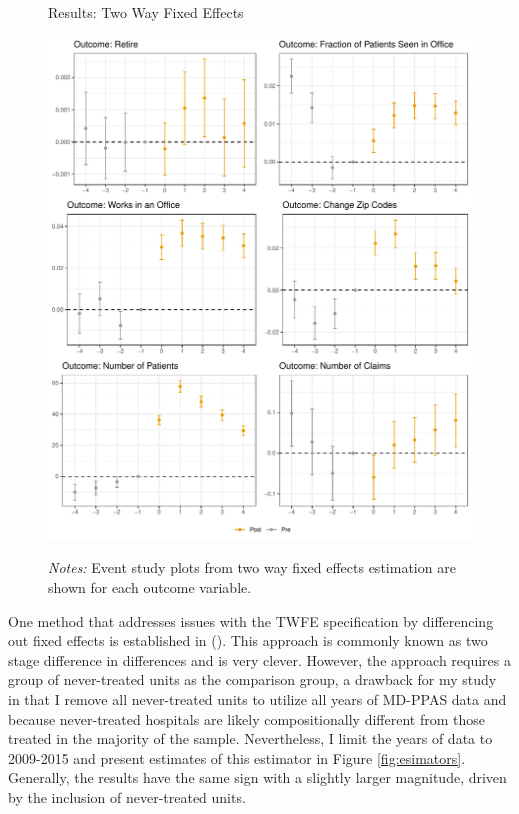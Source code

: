 \documentclass[12pt]{article}
\begin{document}
\begin{figure}
    \centering
    \captionsetup{width=.8\linewidth}
    \caption{Results: Two Way Fixed Effects}
    \includegraphics[scale=.8]{Objects/twfe_plot.pdf}
    \label{fig:twfe}
    \vspace{2mm}
    \caption*{\footnotesize{\textit{Notes:} Event study plots from two way fixed effects estimation are shown for each outcome variable.}}
\end{figure}

One method that addresses issues with the TWFE specification by differencing out fixed effects is established in \citeauthor{gardner2021two} (\citeyear{gardner2021two}). This approach is commonly known as two stage difference in differences and is very clever. However, the approach requires a group of never-treated units as the comparison group, a drawback for my study in that I remove all never-treated units to utilize all years of MD-PPAS data and because never-treated hospitals are likely compositionally different from those treated in the majority of the sample. Nevertheless, I limit the years of data to 2009-2015 and present estimates of this estimator in Figure \ref{fig:esimators}. Generally, the results have the same sign with a slightly larger magnitude, driven by the inclusion of never-treated units. 
\end{document}

